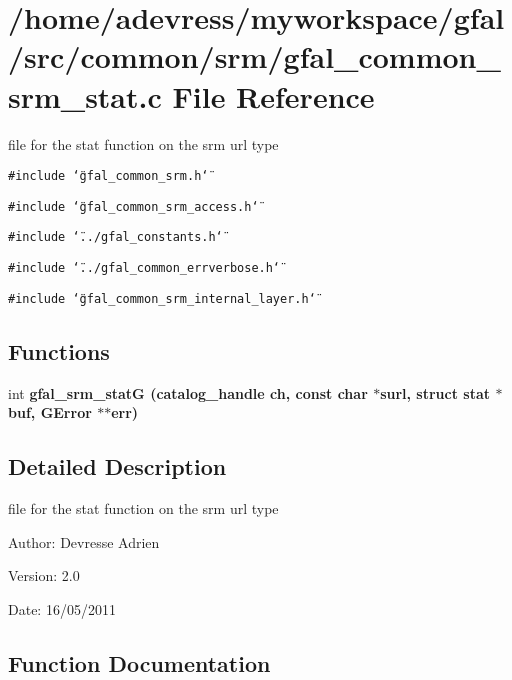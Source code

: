 \section{/home/adevress/myworkspace/gfal/src/common/srm/gfal\_\-common\_\-srm\_\-stat.c File Reference}
\label{gfal__common__srm__stat_8c}
file for the stat function on the srm url type 

{\tt \#include \char`\"{}gfal\_\-common\_\-srm.h\char`\"{}}\par
{\tt \#include \char`\"{}gfal\_\-common\_\-srm\_\-access.h\char`\"{}}\par
{\tt \#include \char`\"{}../gfal\_\-constants.h\char`\"{}}\par
{\tt \#include \char`\"{}../gfal\_\-common\_\-errverbose.h\char`\"{}}\par
{\tt \#include \char`\"{}gfal\_\-common\_\-srm\_\-internal\_\-layer.h\char`\"{}}\par
\subsection*{Functions}
\begin{CompactItemize}
\item 
int \bf{gfal\_\-srm\_\-stat\-G} (catalog\_\-handle ch, const char $\ast$surl, struct stat $\ast$buf, GError $\ast$$\ast$err)
\end{CompactItemize}


\subsection{Detailed Description}
file for the stat function on the srm url type 

\begin{Desc}
\item[Author:]Devresse Adrien \end{Desc}
\begin{Desc}
\item[Version:]2.0 \end{Desc}
\begin{Desc}
\item[Date:]16/05/2011 \end{Desc}


\subsection{Function Documentation}
